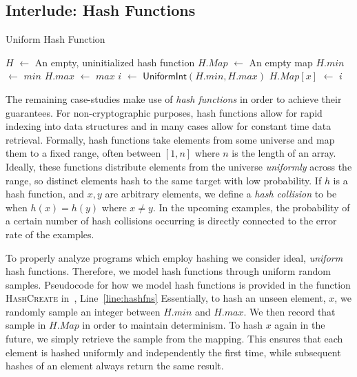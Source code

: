 \documentclass[acmsmall,review,anonymous]{acmart}\settopmatter{printfolios=true,printccs=false,printacmref=false}
\newcommand*\Let[2]{\State #1 $\gets$ #2}
\begin{document}
\subsection{Interlude: Hash Functions}
\label{sec:hash_function}

\begin{algorithm}
  \caption{Uniform Hash Function}
  \label{alg:hash_function}
  \begin{algorithmic}[1]
     \label{line:hashfns}
    \Let{$H$}{An empty, uninitialized hash function}
    \Let{$H.Map$}{An empty map}
    \Let{$H.min$}{$\mathit{min}$}
    \Let{$H.max$}{$\mathit{max}$}
    \State{}
    \EndFunction
    \Statex
    \State{}
    \Else
    \Let{$i$}{$\mathsf{UniformInt}(H.min,H.max)$}
    \Let{$H.Map[x]$}{$i$}
    \State{}
    \EndIf
    \EndFunction
  \end{algorithmic}
\end{algorithm}

The remaining case-studies make use of \textit{hash functions} in order to achieve their guarantees.
% 
For non-cryptographic purposes, hash functions allow for rapid indexing into data structures and in many cases allow for constant time data retrieval.
% 
Formally, hash functions take elements from some universe and map them to a fixed range, often between $[1,n]$ where $n$ is the length of an array.
% 
Ideally, these functions distribute elements from the universe \textit{uniformly} across the range, so distinct elements hash to the same target with low probability.
% 
If $h$ is a hash function, and $x,y$ are arbitrary elements, we define a \textit{hash collision} to be when $h(x) = h(y)$ where $x \neq y$.
% 
In the upcoming examples, the probability of a certain number of hash collisions occurring is directly connected to the error rate of the examples.


To properly analyze programs which employ hashing we consider ideal, \textit{uniform} hash functions.
% 
Therefore, we model hash functions through uniform random samples.
% 
Pseudocode for how we model hash functions is provided in the function \textsc{HashCreate} in~, Line~\ref{line:hashfns}
% 
Essentially, to hash an unseen element, $x$, we randomly sample an integer between $H.min$ and $H.max$.
% 
We then record that sample in $H.Map$ in order to maintain determinism.
% 
To hash $x$ again in the future, we simply retrieve the sample from the mapping.
% 
This ensures that each element is hashed uniformly and independently the first time, while subsequent hashes of an element always return the same result.
\end{document}
